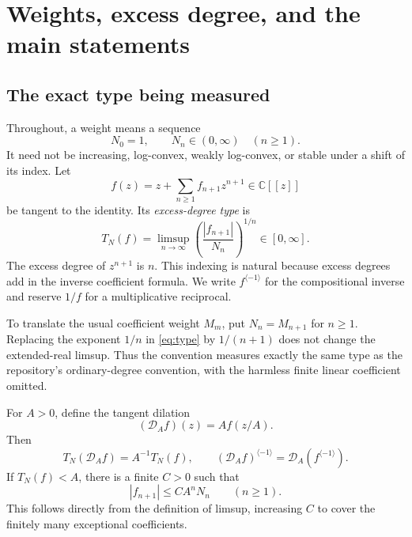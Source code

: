 \documentclass[11pt,a4paper]{article}
\numberwithin{equation}{section}
\theoremstyle{definition}
\theoremstyle{remark}
\newcommand{\C}{\mathbb C}
\newcommand{\Type}{T_N}
\newcommand{\inv}[1]{#1^{\langle-1\rangle}}
\begin{document}
\section{Weights, excess degree, and the main statements}
\label{sec:statements}

\subsection{The exact type being measured}

Throughout, a weight means a sequence
\[
 N_0=1,\qquad N_n\in(0,\infty)\quad(n\ge1).
\]
It need not be increasing, log-convex, weakly log-convex, or stable under
a shift of its index. Let
\begin{equation}
 f(z)=z+\sum_{n\ge1}f_{n+1}z^{n+1}\in\C[[z]]
 \label{eq:tangent}
\end{equation}
be tangent to the identity. Its \emph{excess-degree type} is
\begin{equation}
 \Type(f)=\limsup_{n\to\infty}
 \left(\frac{|f_{n+1}|}{N_n}\right)^{1/n}\in[0,\infty].
 \label{eq:type}
\end{equation}
The excess degree of $z^{n+1}$ is $n$. This indexing is natural because
excess degrees add in the inverse coefficient formula. We write
$\inv f$ for the compositional inverse and reserve $1/f$ for a
multiplicative reciprocal.

To translate the usual coefficient weight $M_m$, put $N_n=M_{n+1}$ for
$n\ge1$. Replacing the exponent $1/n$ in \eqref{eq:type} by $1/(n+1)$
does not change the extended-real limsup. Thus the convention measures
exactly the same type as the repository's ordinary-degree convention,
with the harmless finite linear coefficient omitted.

For $A>0$, define the tangent dilation
\begin{equation}
 (\mathcal D_A f)(z)=A f(z/A).
 \label{eq:dilation}
\end{equation}
Then
\begin{equation}
 \Type(\mathcal D_A f)=A^{-1}\Type(f),\qquad
 \inv{(\mathcal D_A f)}=\mathcal D_A(\inv f).
 \label{eq:dilationproperties}
\end{equation}
If $\Type(f)<A$, there is a finite $C>0$ such that
\begin{equation}
 |f_{n+1}|\le C A^nN_n\qquad(n\ge1).
 \label{eq:coefficientbound}
\end{equation}
This follows directly from the definition of limsup, increasing $C$ to
cover the finitely many exceptional coefficients.
\end{document}
